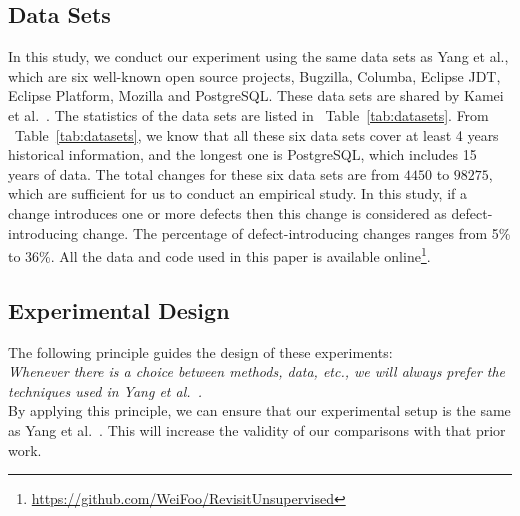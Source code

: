 \documentclass[sigconf]{acmart}
\theoremstyle{break}
\newcommand{\bi}{\begin{itemize}[leftmargin=0.4cm]}
\newcommand{\ei}{\end{itemize}}
\newcommand{\tab}[1]{Table~\ref{tab:#1}}
\begin{document}
\subsection{Data Sets}
In this study, we conduct our experiment using the same data sets as Yang et al.\cite{yang2016effort},
which are six well-known open source projects, Bugzilla, 
Columba, Eclipse JDT, Eclipse Platform, Mozilla and PostgreSQL.
These data sets are shared by Kamei et al.~\cite{kamei2013large}.
The statistics of the data sets are listed in ~\tab{datasets}.
From ~\tab{datasets}, we know that all these six data sets
cover at least 4 years historical information, and the longest one is PostgreSQL, which includes 15 years of data. The total changes for these six data sets
are from $4450$ to $98275$, which are sufficient for us to conduct
an empirical study. In this study, if a change introduces one or more defects then
this change is considered as defect-introducing change. The percentage of 
defect-introducing changes ranges from 5\% to 36\%. All the data and code used in this paper is available online\footnote{\url{https://github.com/WeiFoo/RevisitUnsupervised}}.




\subsection{Experimental Design}\label{exp_design}

The following principle guides the design of these experiments:\\
 {\it Whenever there is a choice between methods, data, etc., we will always prefer the techniques used in Yang et al.~\cite{yang2016effort}.}\\
 By applying this principle, we can ensure that our experimental setup is the same as Yang et al.~\cite{yang2016effort}. This will increase the validity of our comparisons with that prior work.
\end{document}
